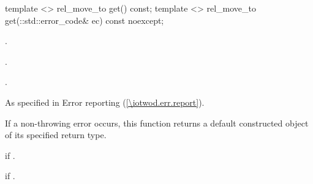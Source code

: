 \begin{itemdecl}
    template <>
    rel_move_to get() const;
    template <>
    rel_move_to get(::std::error_code& ec) const noexcept;
\end{itemdecl}
\begin{itemdescr}
	\pnum
	\preconditions
	.
	
	\pnum
	.
	
	\pnum
	\returns
	.
	
	\pnum
	\throws
	As specified in Error reporting (\ref{\iotwod.err.report}).
	
	\pnum
	\remarks
	If a non-throwing error occurs, this function returns a default constructed object of its specified return type.
	
	\pnum
	\errors
	 if .
	
	\pnum
	 if .

\end{itemdescr}
